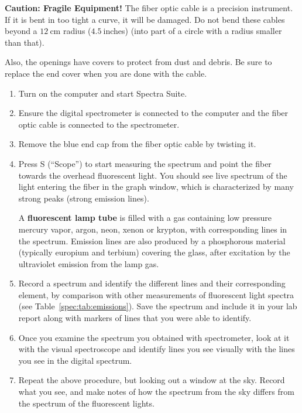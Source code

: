 \begin{framed}
	\textbf{Caution: Fragile Equipment!} The fiber optic cable is a precision instrument. If it is bent in too tight a curve, it will be damaged. Do not bend these cables beyond a $12\:$cm radius ($4.5\:$inches) (into part of a circle with a radius smaller than that).
	
	Also, the openings have covers to protect from dust and debris. Be sure to replace the end cover when you are done with the cable.
\end{framed}

\begin{enumerate}
	\item Turn on the computer and start Spectra Suite.
	
	\item Ensure the digital spectrometer is connected to the computer and the fiber optic cable is connected to the spectrometer.
	
	\item Remove the blue end cap from the fiber optic cable by twisting it.
	
	\item Press S (``Scope'') to start measuring the spectrum %
	and point the fiber towards the overhead fluorescent light. You should see live spectrum of the light
	entering the fiber in the graph window, which is characterized by many strong peaks
	(strong emission lines).
	
\begin{framed}
	A \textbf{fluorescent lamp tube} is filled with a gas containing low pressure mercury vapor,
		argon, neon, xenon or krypton, with corresponding lines in the spectrum. Emission lines
		are also produced by a phosphorous material (typically europium and terbium) covering
		the glass, after excitation by the ultraviolet emission from the lamp gas.
\end{framed}

	\item Record a spectrum and identify the different lines and their corresponding element, by
	comparison with other measurements of fluorescent light spectra (see Table~\ref{spec:tab:emissions}). Save the spectrum and
	include it in your lab report along with markers of lines that you were able to identify.
	
	\item Once you examine the spectrum you obtained with spectrometer, look at it with the visual
	spectroscope and identify lines you see visually with the lines you see in the digital
	spectrum.
	
	\item Repeat the above procedure, but looking out a window at the sky. Record what you see,
	and make notes of how the spectrum from the sky differs from the spectrum of the
	fluorescent lights.

\end{enumerate}

